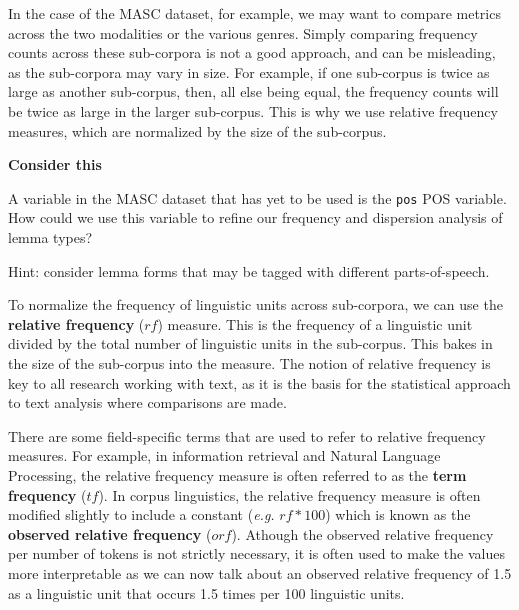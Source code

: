 \documentclass[
  letterpaper,
  krantz1]{latex/krantz-mod}
\theoremstyle{definition}
\theoremstyle{definition}
\theoremstyle{remark}
\begin{document}
In the case of the MASC dataset, for example, we may want to compare
metrics across the two modalities or the various genres. Simply
comparing frequency counts across these sub-corpora is not a good
approach, and can be misleading, as the sub-corpora may vary in size.
For example, if one sub-corpus is twice as large as another sub-corpus,
then, all else being equal, the frequency counts will be twice as large
in the larger sub-corpus. This is why we use relative frequency
measures, which are normalized by the size of the sub-corpus.

\begin{tcolorbox}[enhanced jigsaw, leftrule=.75mm, colframe=quarto-callout-color-frame, left=2mm, colback=white, toprule=.15mm, breakable, arc=.35mm, opacityback=0, bottomrule=.15mm, rightrule=.15mm]

\textbf{ Consider this}

A variable in the MASC dataset that has yet to be used is the
\texttt{pos} POS variable. How could we use this variable to refine our
frequency and dispersion analysis of lemma types?

Hint: consider lemma forms that may be tagged with different
parts-of-speech.

\end{tcolorbox}

To normalize the frequency of linguistic units across sub-corpora, we
can use the \textbf{relative frequency} (\(rf\)) measure. This is the
frequency of a linguistic unit divided by the total number of linguistic
units in the sub-corpus. This bakes in the size of the sub-corpus into
the measure. The notion of relative frequency is key to all research
working with text, as it is the basis for the statistical approach to
text analysis where comparisons are made.

There are some field-specific terms that are used to refer to relative
frequency measures. For example, in information retrieval and Natural
Language Processing, the relative frequency measure is often referred to
as the \textbf{term frequency} (\(tf\)). In corpus linguistics, the
relative frequency measure is often modified slightly to include a
constant (\emph{e.g.} \(rf * 100\)) which is known as the
\textbf{observed relative frequency} (\(orf\)). Athough the observed
relative frequency per number of tokens is not strictly necessary, it is
often used to make the values more interpretable as we can now talk
about an observed relative frequency of 1.5 as a linguistic unit that
occurs 1.5 times per 100 linguistic units.
\end{document}
